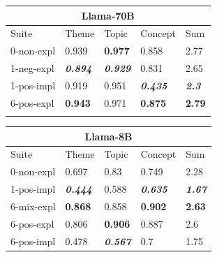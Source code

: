 \begin{table}
    \centering
    \scriptsize
    \begin{tabular}{lllll}
    \toprule
    \multicolumn{5}{c}{\textbf{Llama-70B}} \\
    \midrule
    Suite & Theme & Topic & Concept & Sum \\
    \midrule
    0-non-expl & 0.939 & \bfseries 0.977 & 0.858 & 2.77 \\
    1-neg-expl & \bfseries \itshape 0.894 & \bfseries \itshape 0.929 & 0.831 & 2.65 \\
    1-pos-impl & 0.919 & 0.951 & \bfseries \itshape 0.435 & \bfseries \itshape 2.3 \\
    6-pos-expl & \bfseries 0.943 & 0.971 & \bfseries 0.875 & \bfseries 2.79 \\
    & & & & \\
    \bottomrule
    \end{tabular}
    \begin{tabular}{lllll}
    \toprule
    \multicolumn{5}{c}{\textbf{Llama-8B}} \\
    \midrule
    Suite & Theme & Topic & Concept & Sum \\
    \midrule
    0-non-expl & 0.697 & 0.83 & 0.749 & 2.28 \\
    1-pos-impl & \bfseries \itshape 0.444 & 0.588 & \bfseries \itshape 0.635 & \bfseries \itshape 1.67 \\
    6-mix-expl & \bfseries 0.868 & 0.858 & \bfseries 0.902 & \bfseries 2.63 \\
    6-pos-expl & 0.806 & \bfseries 0.906 & 0.887 & 2.6 \\
    6-pos-impl & 0.478 & \bfseries \itshape 0.567 & 0.7 & 1.75 \\
    \bottomrule
    \end{tabular}
    

\end{table}
